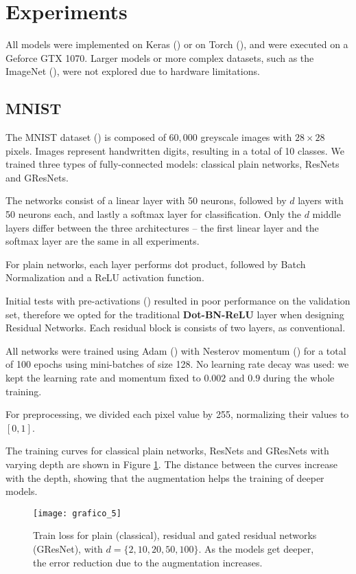 \documentclass{article} %
\begin{document}
\section{Experiments}

All models were implemented on Keras (\cite{keras}) or on Torch (\cite{t7}), and were executed on a Geforce GTX 1070. Larger models or more complex datasets, such as the ImageNet (\cite{imagenet}), were not explored due to hardware limitations.

\subsection{MNIST}

The MNIST dataset (\cite{mnist}) is composed of $60,000$ greyscale images with $28 \times 28$ pixels. Images represent handwritten digits, resulting in a total of 10 classes. We trained three types of fully-connected models: classical plain networks, ResNets and GResNets.

The networks consist of a linear layer with 50 neurons, followed by $d$ layers with 50 neurons each, and lastly a softmax layer for classification. Only the $d$ middle layers differ between the three architectures -- the first linear layer and the softmax layer are the same in all experiments.

For plain networks, each layer performs dot product, followed by Batch Normalization and a ReLU activation function.

Initial tests with pre-activations (\cite{resnet2}) resulted in poor performance on the validation set, therefore we opted for the traditional \textbf{Dot-BN-ReLU} layer when designing Residual Networks. Each residual block is consists of two layers, as conventional.

All networks were trained using Adam (\cite{adam}) with Nesterov momentum (\cite{adamnest}) for a total of 100 epochs using mini-batches of size 128. No learning rate decay was used: we kept the learning rate and momentum fixed to $0.002$ and $0.9$ during the whole training.

For preprocessing, we divided each pixel value by 255, normalizing their values to $[0,1]$.

The training curves for classical plain networks, ResNets and GResNets with varying depth are shown in Figure \ref{mnist_loss}. The distance between the curves increase with the depth, showing that the augmentation helps the training of deeper models.

\begin{figure}[!ht]
  \centering
    \texttt{[image: grafico\_5]}
  \caption{Train loss for plain (classical), residual and gated residual networks (GResNet), with $d = \{2,10,20,50,100\}$. As the models get deeper, the error reduction due to the augmentation increases.}
\label{mnist_loss}
\end{figure}
\end{document}
